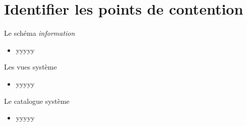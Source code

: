 
\section{Identifier les points de contention}


\begin{frame}[fragile]{Le schéma \textit{information}}


   \begin{itemize}
      \item yyyyy
   \end{itemize}

\begin{toile}
\end{toile}

\end{frame}


\begin{frame}[fragile]{Les vues système}


   \begin{itemize}
      \item yyyyy
   \end{itemize}

\begin{toile}
\end{toile}

\end{frame}


\begin{frame}[fragile]{Le catalogue système}


   \begin{itemize}
      \item yyyyy
   \end{itemize}

\begin{toile}
\end{toile}

\end{frame}

